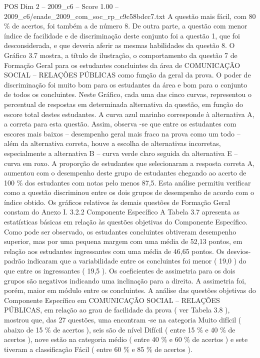 \begin{textsample}{POS Dim 2 – 2009\_c6 – Score 1.00 – 2009\_c6/enade\_2009\_com\_soc\_rp\_c9c58bdcc7.txt}
A questão mais fácil, com 80 \% de acertos, foi também a de número 8.
De outra parte, a questão com menor índice de facilidade e de discriminação deste conjunto foi a questão 1, que foi desconsiderada, e que deveria aferir as mesmas habilidades da questão 8.
O Gráfico 3.7 mostra, a título de ilustração, o comportamento da questão 7 de Formação Geral para os estudantes concluintes da área de COMUNICAÇÃO SOCIAL – RELAÇÕES PÚBLICAS como função da geral da prova.
O poder de discriminação foi muito bom para os estudantes da área e bom para o conjunto de todos os concluintes.
Neste Gráfico, cada uma das cinco curvas, representou o percentual de respostas em determinada alternativa da questão, em função do escore total destes estudantes.
A curva azul marinho corresponde à alternativa A, a correta para esta questão.
Assim, observa -se que entre os estudantes com escores mais baixos – desempenho geral mais fraco na prova como um todo – além da alternativa correta, houve a escolha de alternativas incorretas, especialmente a alternativa B – curva verde claro seguida da alternativa E – curva em roxo.
A proporção de estudantes que selecionaram a resposta correta A, aumentou com o desempenho deste grupo de estudantes chegando ao acerto de 100 \% dos estudantes com notas pelo menos 87,5.
Esta análise permitiu verificar como a questão discriminou entre os dois grupos de desempenho de acordo com o índice obtido.
Os gráficos relativos às demais questões de Formação Geral constam do Anexo I. 3.2.2 Componente Específico A Tabela 3.7 apresenta as estatísticas básicas em relação às questões objetivas do Componente Específico.
Como pode ser observado, os estudantes concluintes obtiveram desempenho superior, mas por uma pequena margem com uma média de 52,13 pontos, em relação aos estudantes ingressantes com uma média de 46,65 pontos.
Os desvios-padrão indicaram que a variabilidade entre os concluintes foi menor ( 19,0 ) do que entre os ingressantes ( 19,5 ).
Os coeficientes de assimetria para os dois grupos são negativos indicando uma inclinação para a direita.
A assimetria foi, porém, maior em módulo entre os concluintes.
A análise das questões objetivas do Componente Específico em COMUNICAÇÃO SOCIAL – RELAÇÕES PÚBLICAS, em relação ao grau de facilidade da prova ( ver Tabela 3.8 ), mostrou que, das 27 questões, uma encontram -se na categoria Muito difícil ( abaixo de 15 \% de acertos ), seis são de nível Difícil ( entre 15 \% e 40 \% de acertos ), nove estão na categoria médio ( entre 40 \% e 60 \% de acertos ) e sete tiveram a classificação Fácil ( entre 60 \% e 85 \% de acertos ).

\end{textsample}
